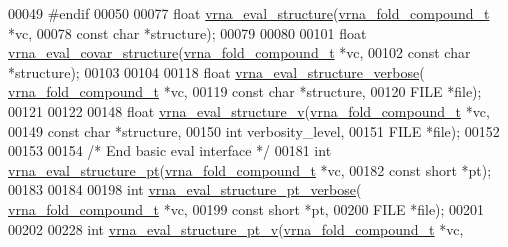\begin{DoxyCode}
00049 \textcolor{preprocessor}{#endif}
00050 
00077 \textcolor{keywordtype}{float} \mbox{\hyperlink{group__eval_ga58f199f1438d794a265f3b27fc8ea631}{vrna\_eval\_structure}}(\mbox{\hyperlink{group__fold__compound_structvrna__fc__s}{vrna\_fold\_compound\_t}}  *vc,
00078                           \textcolor{keyword}{const} \textcolor{keywordtype}{char}            *structure);
00079 
00080 
00101 \textcolor{keywordtype}{float} \mbox{\hyperlink{group__eval_ga6cea75c0eb9857fb59172be54cab09e0}{vrna\_eval\_covar\_structure}}(\mbox{\hyperlink{group__fold__compound_structvrna__fc__s}{vrna\_fold\_compound\_t}}  *vc,
00102                                 \textcolor{keyword}{const} \textcolor{keywordtype}{char}            *structure);
00103 
00104 
00118 \textcolor{keywordtype}{float} \mbox{\hyperlink{group__eval_ga0928d699d310178f84ee2351034e5cb5}{vrna\_eval\_structure\_verbose}}(
      \mbox{\hyperlink{group__fold__compound_structvrna__fc__s}{vrna\_fold\_compound\_t}}  *vc,
00119                                   \textcolor{keyword}{const} \textcolor{keywordtype}{char}            *structure,
00120                                   FILE                  *file);
00121 
00122 
00148 \textcolor{keywordtype}{float} \mbox{\hyperlink{group__eval_gab12e6b1226227670322150df018734f8}{vrna\_eval\_structure\_v}}(\mbox{\hyperlink{group__fold__compound_structvrna__fc__s}{vrna\_fold\_compound\_t}}  *vc,
00149                             \textcolor{keyword}{const} \textcolor{keywordtype}{char}            *structure,
00150                             \textcolor{keywordtype}{int}                   verbosity\_level,
00151                             FILE                  *file);
00152 
00153 
00154 \textcolor{comment}{/* End basic eval interface */}
00181 \textcolor{keywordtype}{int} \mbox{\hyperlink{group__eval_gadbd09372ddfd7a450bbd590c96a6bfe4}{vrna\_eval\_structure\_pt}}(\mbox{\hyperlink{group__fold__compound_structvrna__fc__s}{vrna\_fold\_compound\_t}} *vc,
00182                            \textcolor{keyword}{const} \textcolor{keywordtype}{short}          *pt);
00183 
00184 
00198 \textcolor{keywordtype}{int} \mbox{\hyperlink{group__eval_ga8a517cfeeae8c376ae7b1e0c401d38b4}{vrna\_eval\_structure\_pt\_verbose}}(
      \mbox{\hyperlink{group__fold__compound_structvrna__fc__s}{vrna\_fold\_compound\_t}} *vc,
00199                                    \textcolor{keyword}{const} \textcolor{keywordtype}{short}          *pt,
00200                                    FILE                 *file);
00201 
00202 
00228 \textcolor{keywordtype}{int} \mbox{\hyperlink{group__eval_ga2c6533ba0afe4c88d335d8f1e0e2a48e}{vrna\_eval\_structure\_pt\_v}}(\mbox{\hyperlink{group__fold__compound_structvrna__fc__s}{vrna\_fold\_compound\_t}} *vc,

\end{DoxyCode}
